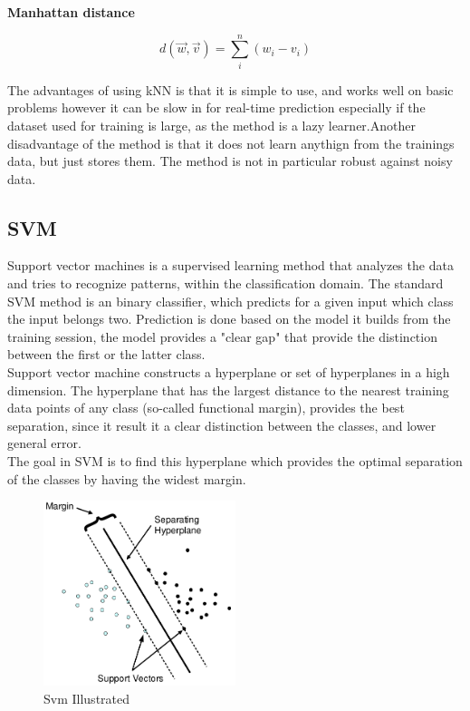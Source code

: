 \textbf{Manhattan distance}

\begin{equation}
d(\overrightarrow{w},\overrightarrow{v}) = \sum_{i}^n (w_i - v_i)
\end{equation}

The advantages of using kNN is that it is simple to use, and works well on basic problems however it can be slow in for real-time prediction especially if the dataset used for training is large, as the method is a lazy learner.Another disadvantage of the method is that it does not learn anythign from the trainings data, but just stores them.  The method is not in particular robust against noisy data.    
\subsection{SVM}
Support vector machines is a supervised learning method that analyzes the data 
and tries to recognize patterns, within the classification domain.
 The standard SVM method is an binary classifier, which predicts for a given 
input which class the input belongs two. 
 Prediction is done based on the model it builds from the training session, the 
model provides a "clear gap" that provide the distinction between the first or 
the latter class. \\

Support vector machine constructs a hyperplane or set of hyperplanes in a high 
dimension. 
The hyperplane that has the largest distance to the nearest training data points 
of any class (so-called functional margin), provides the best separation,  since 
it result it a clear distinction between the classes, and lower general error.
\\

The goal in SVM is to find this hyperplane which provides the optimal separation 
of the classes by having the widest margin. 

\begin{figure}[H]
\centering
\includegraphics[width = 0.5\textwidth]{img/SVM-illu.png}
\caption{Svm Illustrated}
\label{fig::SVM-illustrated}
\end{figure}

